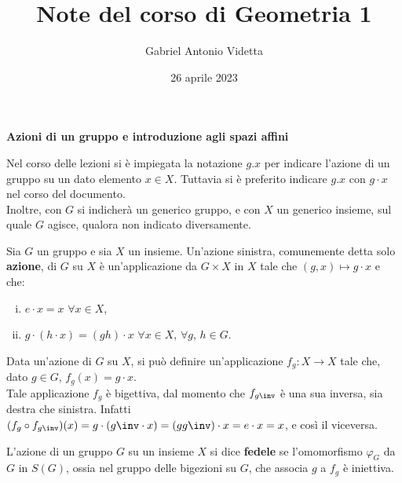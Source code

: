 \documentclass[11pt]{article}
\title{\textbf{Note del corso di Geometria 1}}
\author{Gabriel Antonio Videtta}
\date{26 aprile 2023}
\begin{document}
	
	\maketitle
	
	\begin{center}
		\Large \textbf{Azioni di un gruppo e introduzione agli spazi affini}
	\end{center}
	
	\wip
	
	\begin{note}
		Nel corso delle lezioni si è impiegata la notazione $g.x$ per indicare
		l'azione di un gruppo su un dato elemento $x \in X$. Tuttavia si è
		preferito indicare $g.x$ con $g \cdot x$ nel corso del documento. \\
		
		Inoltre, con $G$ si indicherà un generico gruppo, e con $X$ un
		generico insieme, sul quale $G$ agisce, qualora non indicato diversamente.
	\end{note}

	\begin{definition} 
		Sia $G$ un gruppo e sia $X$ un insieme. Un'azione sinistra, comunemente detta solo \textbf{azione}, di $G$
		su $X$ è un'applicazione da $G \times X$ in $X$ tale
		che $(g, x) \mapsto g \cdot x$ e che:
		
		\begin{enumerate}[(i)]
			\item $e \cdot x = x$ $\forall x \in X$,
			\item $g \cdot (h \cdot x) = (gh) \cdot x$ $\forall x \in X$, $\forall g$, $h \in G$.
		\end{enumerate}
	\end{definition}

	\begin{remark}\nl
		\li Data un'azione di $G$ su $X$, si può definire un'applicazione
		$f_g : X \to X$ tale che, dato $g \in G$, $f_g(x) = g \cdot x$. \\
		\li Tale applicazione $f_g$ è bigettiva, dal momento che $f_{g\inv}$ è una sua
		inversa, sia destra che sinistra. Infatti $(f_g \circ f_{g\inv})(x) =
		g \cdot (g\inv \cdot x) = (g g\inv) \cdot x = e \cdot x = x$, e così il viceversa. 
	\end{remark}

	\begin{definition}
		L'azione di un gruppo $G$ su un insieme $X$ si dice \textbf{fedele} se
		l'omomorfismo $\varphi_G$ da $G$ in $S(G)$, ossia nel gruppo delle bigezioni su $G$, che
		associa $g$ a $f_g$ è iniettiva.
	\end{definition}
	
\end{document}
